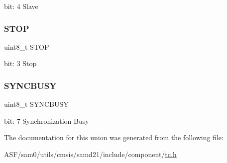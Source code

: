 bit\+: 4 Slave \mbox{\label{union_t_c___s_t_a_t_u_s___type_aa328a90a4697c4eedde37d25cdf30bd3}} 
\subsubsection{\texorpdfstring{STOP}{STOP}}
{\footnotesize\ttfamily uint8\+\_\+t S\+T\+OP}

bit\+: 3 Stop \mbox{\label{union_t_c___s_t_a_t_u_s___type_abb30254758e23bd24824e436a1aa8716}} 
\subsubsection{\texorpdfstring{SYNCBUSY}{SYNCBUSY}}
{\footnotesize\ttfamily uint8\+\_\+t S\+Y\+N\+C\+B\+U\+SY}

bit\+: 7 Synchronization Busy 

The documentation for this union was generated from the following file\+:\begin{DoxyCompactItemize}
\item 
A\+S\+F/sam0/utils/cmsis/samd21/include/component/\mbox{\hyperlink{utils_2cmsis_2samd21_2include_2component_2tc_8h}{tc.\+h}}\end{DoxyCompactItemize}
